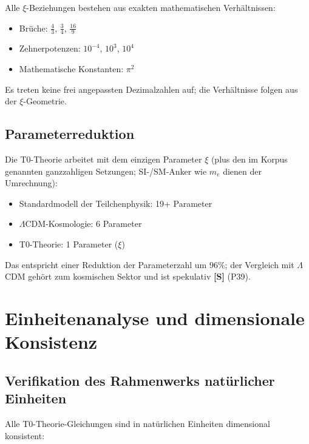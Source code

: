 	\begin{important}
		Alle $\xi$-Beziehungen bestehen aus exakten mathematischen Verhältnissen:
		\begin{itemize}
			\item Brüche: $\frac{4}{3}$, $\frac{3}{4}$, $\frac{16}{9}$
			\item Zehnerpotenzen: $10^{-4}$, $10^3$, $10^4$
			\item Mathematische Konstanten: $\pi^2$
		\end{itemize}
		Es treten keine frei angepassten Dezimalzahlen auf; die Verhältnisse folgen aus der $\xi$-Geometrie.
	\end{important}
	
	\subsection{Parameterreduktion}
	
	\begin{important}[Parameterzahl]
		Die T0-Theorie arbeitet mit dem einzigen Parameter $\xi$ (plus den im Korpus genannten ganzzahligen Setzungen; SI-/SM-Anker wie $m_e$ dienen der Umrechnung):
		\begin{itemize}
			\item Standardmodell der Teilchenphysik: 19+ Parameter
			\item $\Lambda$CDM-Kosmologie: 6 Parameter
			\item T0-Theorie: 1 Parameter ($\xi$)
		\end{itemize}
		Das entspricht einer Reduktion der Parameterzahl um 96\%; der Vergleich mit $\Lambda$CDM gehört zum kosmischen Sektor und ist spekulativ \textbf{[S]} (P39).
	\end{important}
	
	\section{Einheitenanalyse und dimensionale Konsistenz}
	
	\subsection{Verifikation des Rahmenwerks natürlicher Einheiten}
	
	Alle T0-Theorie-Gleichungen sind in natürlichen Einheiten dimensional konsistent:
	
